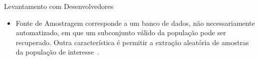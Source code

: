\documentclass[t,14pt,mathserif]{beamer}
\begin{document}
\begin{frame}{Levantamento com Desenvolvedores}

    \begin{itemize}
        \item {Fonte de Amostragem} corresponde a um banco de dados, não
            necessariamente automatizado, em que um subconjunto válido da
            população pode ser recuperado. Outra característica é permitir a
            extração aleatória de amostras da população de
            interesse~\cite{de2014towards}.
    \end{itemize}

    \begin{table}[htpb]
        \centering
        \caption{Fontes de Amostragem utilizadas no estudo}
        \label{tab:fontes-amostragens}
    \end{table}
\end{frame}
\end{document}
